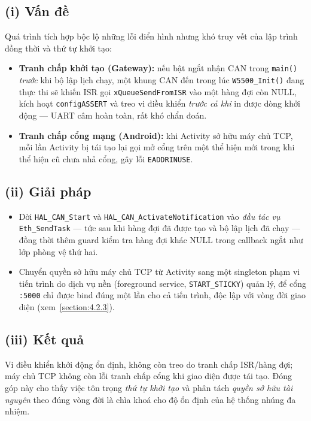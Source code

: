 \documentclass[../DoAn.tex]{subfiles}
\begin{document}
\subsection*{(i) Vấn đề}
Quá trình tích hợp bộc lộ những lỗi điển hình nhưng khó truy vết của lập trình
đồng thời và thứ tự khởi tạo:
\begin{itemize}
  \item \textbf{Tranh chấp khởi tạo (Gateway):} nếu bật ngắt nhận CAN trong
    \texttt{main()} \emph{trước} khi bộ lập lịch chạy, một khung CAN đến trong lúc
    \texttt{W5500\_Init()} đang thực thi sẽ khiến ISR gọi
    \texttt{xQueueSendFromISR} vào một hàng đợi còn NULL, kích hoạt
    \texttt{configASSERT} và treo vi điều khiển \emph{trước cả khi} in được dòng
    khởi động — UART câm hoàn toàn, rất khó chẩn đoán.
  \item \textbf{Tranh chấp cổng mạng (Android):} khi Activity sở hữu máy chủ TCP,
    mỗi lần Activity bị tái tạo lại gọi mở cổng trên một thể hiện mới trong khi
    thể hiện cũ chưa nhả cổng, gây lỗi \texttt{EADDRINUSE}.
\end{itemize}

\subsection*{(ii) Giải pháp}
\begin{itemize}
  \item Dời \texttt{HAL\_CAN\_Start} và \texttt{HAL\_CAN\_ActivateNotification}
    vào \emph{đầu tác vụ} \texttt{Eth\_SendTask} — tức sau khi hàng đợi đã được
    tạo và bộ lập lịch đã chạy — đồng thời thêm guard kiểm tra hàng đợi khác NULL
    trong callback ngắt như lớp phòng vệ thứ hai.
  \item Chuyển quyền sở hữu máy chủ TCP từ Activity sang một singleton phạm vi
    tiến trình do dịch vụ nền (foreground service, \texttt{START\_STICKY}) quản
    lý, để cổng \texttt{:5000} chỉ được bind đúng một lần cho cả tiến trình, độc
    lập với vòng đời giao diện (xem~\ref{section:4.2.3}).
\end{itemize}

\subsection*{(iii) Kết quả}
Vi điều khiển khởi động ổn định, không còn treo do tranh chấp ISR/hàng đợi; máy
chủ TCP không còn lỗi tranh chấp cổng khi giao diện được tái tạo. Đóng góp này
cho thấy việc tôn trọng \emph{thứ tự khởi tạo} và phân tách \emph{quyền sở hữu tài
nguyên} theo đúng vòng đời là chìa khoá cho độ ổn định của hệ thống nhúng đa
nhiệm.
\end{document}
